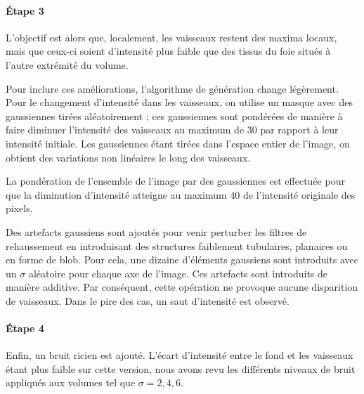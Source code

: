 \paragraph{Étape 3}
 L'objectif est alors que, localement, les vaisseaux restent des maxima locaux, mais que ceux-ci soient d'intensité plus faible que des tissus du foie situés à l'autre extrémité du volume.

Pour inclure ces améliorations, l'algorithme de génération change légèrement. Pour le changement d'intensité dans les vaisseaux, on utilise un masque avec des gaussiennes tirées aléatoirement ; ces gaussiennes sont pondérées de manière à faire diminuer l'intensité des vaisseaux au maximum de $30$ \percent{} par rapport à leur intensité initiale. Les gaussiennes étant tirées dans l'espace entier de l'image, on obtient des variations non linéaires le long des vaisseaux.

La pondération de l'ensemble de l'image par des gaussiennes est effectuée pour que la diminution d'intensité atteigne au maximum $40$ \percent{} de l'intensité originale des pixels.

Des artefacts gaussiens sont ajoutés pour venir perturber les filtres de rehaussement en introduisant des structures faiblement tubulaires, planaires ou en forme de blob. Pour cela, une dizaine d'éléments gaussiens sont introduits avec un $\sigma$ aléatoire pour chaque axe de l'image. Ces artefacts sont introduits de manière additive. Par conséquent, cette opération ne provoque aucune disparition de vaisseaux. Dans le pire des cas, un saut d'intensité est observé.
\paragraph{Étape 4}
Enfin, un bruit ricien est ajouté. L'écart d'intensité entre le fond et les vaisseaux étant plus faible sur cette version, nous avons revu les différents niveaux de bruit appliqués aux volumes tel que $\sigma={2,4,6}$.

